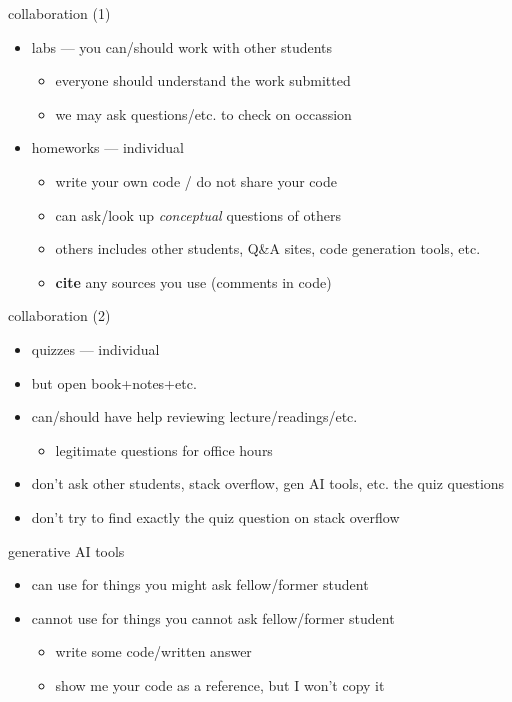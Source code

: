 \begin{frame}{collaboration (1)}
    \begin{itemize}
    \item labs --- you can/should work with other students
        \begin{itemize}
        \item everyone should understand the work submitted
        \item we may ask questions/etc. to check on occassion
        \end{itemize}
    \item homeworks --- individual
        \begin{itemize}
        \item write your own code / do not share your code
        \item can ask/look up \textit{conceptual} questions of others
        \item others includes other students, Q\&A sites, code generation tools, etc.
        \item \textbf{cite} any sources you use (comments in code)
        \end{itemize}
    \end{itemize}
\end{frame}

\begin{frame}{collaboration (2)}
    \begin{itemize}
    \item quizzes --- individual
    \vspace{.5cm}
    \item but open book+notes+etc.
    \item can/should have help reviewing lecture/readings/etc.
        \begin{itemize}
        \item legitimate questions for office hours
        \end{itemize}
    \item don't ask other students, stack overflow, gen AI tools, etc. the quiz questions
    \item don't try to find exactly the quiz question on stack overflow
    \end{itemize}
\end{frame}

\begin{frame}{generative AI tools}
    \begin{itemize}
    \item can use for things you might ask fellow/former student
    \vspace{.5cm}
    \item cannot use for things you cannot ask fellow/former student
        \begin{itemize}
        \item write some code/written answer
        \item show me your code as a reference, but I won't copy it
        \end{itemize}
    \end{itemize}
\end{frame}
